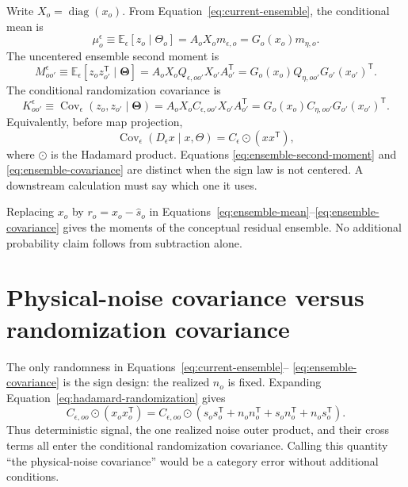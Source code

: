 \documentclass[11pt]{article}
\newcommand{\E}{\mathbb{E}}
\newcommand{\Cov}{\operatorname{Cov}}
\newcommand{\diag}{\operatorname{diag}}
\newcommand{\ThetaV}{\boldsymbol{\Theta}}
\begin{document}
Write $X_o=\diag(x_o)$.  From
Equation~\eqref{eq:current-ensemble}, the conditional mean is
\begin{equation}
  \mu_o^{\epsilon}
  \equiv\E_\epsilon[z_o\mid\Theta_o]
  =A_oX_om_{\epsilon,o}
  =G_o(x_o)m_{\eta,o}.
  \label{eq:ensemble-mean}
\end{equation}
The uncentered ensemble second moment is
\begin{equation}
  M_{oo'}^{\epsilon}
  \equiv\E_\epsilon[z_oz_{o'}^{\mathsf T}\mid\ThetaV]
  =A_oX_oQ_{\epsilon,oo'}X_{o'}A_{o'}^{\mathsf T}
  =G_o(x_o)Q_{\eta,oo'}G_{o'}(x_{o'})^{\mathsf T}.
  \label{eq:ensemble-second-moment}
\end{equation}
The conditional randomization covariance is
\begin{equation}
  K_{oo'}^{\epsilon}
  \equiv\Cov_\epsilon(z_o,z_{o'}\mid\ThetaV)
  =A_oX_oC_{\epsilon,oo'}X_{o'}A_{o'}^{\mathsf T}
  =G_o(x_o)C_{\eta,oo'}G_{o'}(x_{o'})^{\mathsf T}.
  \label{eq:ensemble-covariance}
\end{equation}
Equivalently, before map projection,
\begin{equation}
  \Cov_\epsilon(D_\epsilon x\mid x,\Theta)
  =C_\epsilon\odot(xx^{\mathsf T}),
  \label{eq:hadamard-randomization}
\end{equation}
where $\odot$ is the Hadamard product.  Equations
\eqref{eq:ensemble-second-moment} and \eqref{eq:ensemble-covariance} are
distinct when the sign law is not centered.  A downstream calculation must
say which one it uses.

Replacing $x_o$ by $r_o=x_o-\widehat s_o$ in
Equations~\eqref{eq:ensemble-mean}--\eqref{eq:ensemble-covariance} gives the
moments of the conceptual residual ensemble.  No additional probability
claim follows from subtraction alone.

\section{Physical-noise covariance versus randomization covariance}

The only randomness in Equations~\eqref{eq:current-ensemble}--
\eqref{eq:ensemble-covariance} is the sign design: the realized $n_o$ is
fixed.  Expanding Equation~\eqref{eq:hadamard-randomization} gives
\begin{equation}
  C_{\epsilon,oo}\odot(x_ox_o^{\mathsf T})
  =C_{\epsilon,oo}\odot
  \left(s_os_o^{\mathsf T}+n_on_o^{\mathsf T}
  +s_on_o^{\mathsf T}+n_os_o^{\mathsf T}\right).
  \label{eq:fixed-realization-decomposition}
\end{equation}
Thus deterministic signal, the one realized noise outer product, and their
cross terms all enter the conditional randomization covariance.  Calling this
quantity ``the physical-noise covariance'' would be a category error without
additional conditions.
\end{document}
